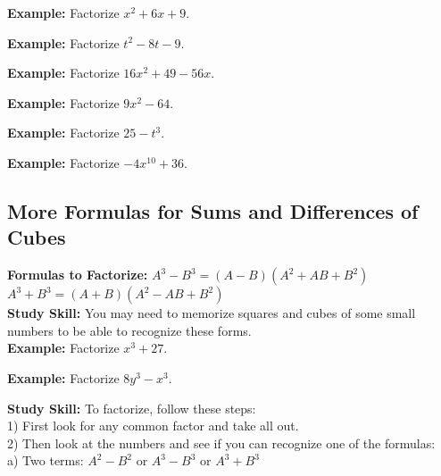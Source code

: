 \documentclass{ximera}
\begin{document}
{\bf Example:} Factorize $x^2 + 6x + 9 $.\\
\vspace{2 cm}

{\bf Example:} Factorize $t^2 -8t - 9$.\\
\vspace{2 cm}

{\bf Example:} Factorize $16x^2 + 49 -56x$.\\
\vspace{2 cm}

{\bf Example:} Factorize $9x^2 - 64$.\\
\vspace{2 cm}

{\bf Example:} Factorize $25 - t^3$.\\
\vspace{2 cm}

{\bf Example:} Factorize $-4x^{10} + 36$.\\
\vspace{2 cm}

\subsection{More Formulas for Sums and Differences of Cubes}

{\bf Formulas to Factorize:} $A^3 - B^3 =(A-B)(A^2 + AB + B^2) $\\

$A^3 + B^3 = (A+B)(A^2 -AB + B^2) $\\

{\bf Study Skill:} You may need to memorize squares and cubes of some small numbers to be able to recognize these forms.\\

{\bf Example:} Factorize $x^3 + 27 $.\\
\vspace{2 cm}

{\bf Example:} Factorize $8y^3 - x^3$.\\
\vspace{2 cm}

{\bf Study Skill:} To factorize, follow these steps:\\

1) First look for any common factor and take all out.\\

2) Then look at the numbers and see if you can recognize one of the formulas:\\

a) Two terms: $A^2 - B^2$ or  $A^3 - B^3$ or $A^3 + B^3$\\
\end{document}
